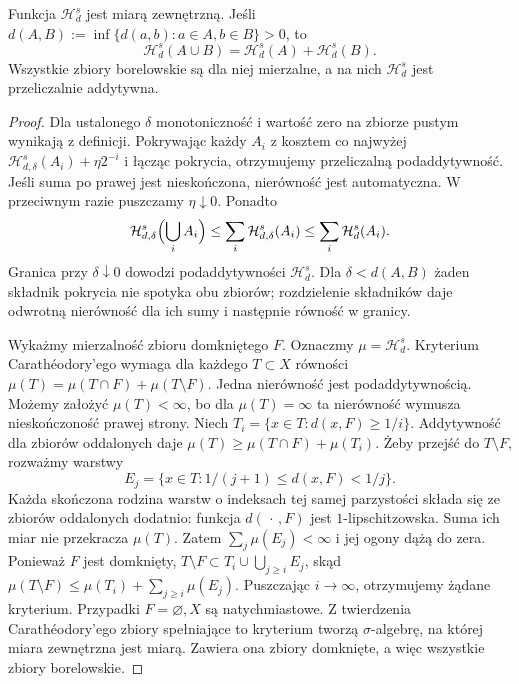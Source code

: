 \begin{stwierdzenie}
\label{prop:hausdorff-borel}
Funkcja $\mathcal H^s_d$ jest miarą zewnętrzną.
Jeśli $d(A,B):=\inf\{d(a,b):a\in A,b\in B\}>0$, to
\[
 \mathcal H^s_d(A\cup B)=\mathcal H^s_d(A)+\mathcal H^s_d(B).
\]
Wszystkie zbiory borelowskie są dla niej mierzalne,
a na nich $\mathcal H^s_d$ jest przeliczalnie addytywna.
\end{stwierdzenie}
\begin{proof}
Dla ustalonego $\delta$ monotoniczność i wartość zero
na zbiorze pustym wynikają z definicji. Pokrywając
każdy $A_i$ z kosztem co najwyżej
$\mathcal H^s_{d,\delta}(A_i)+\eta2^{-i}$ i łącząc
pokrycia, otrzymujemy przeliczalną podaddytywność.
Jeśli suma po prawej jest nieskończona, nierówność
jest automatyczna. W przeciwnym razie puszczamy
$\eta\downarrow0$. Ponadto
\[
 \mathcal H^s_{d,\delta}\Bigl(\bigcup_i A_i\Bigr)
 \leq\sum_i\mathcal H^s_{d,\delta}(A_i)
 \leq\sum_i\mathcal H^s_d(A_i).
\]
Granica przy $\delta\downarrow0$ dowodzi
podaddytywności $\mathcal H^s_d$. Dla
$\delta<d(A,B)$ żaden składnik pokrycia nie spotyka
obu zbiorów; rozdzielenie składników daje odwrotną
nierówność dla ich sumy i następnie równość w granicy.

Wykażmy mierzalność zbioru domkniętego $F$.
Oznaczmy $\mu=\mathcal H^s_d$. Kryterium Carathéodory'ego
wymaga dla każdego $T\subset X$ równości
$\mu(T)=\mu(T\cap F)+\mu(T\setminus F)$.
Jedna nierówność jest podaddytywnością. Możemy założyć
$\mu(T)<\infty$, bo dla $\mu(T)=\infty$ ta nierówność
wymusza nieskończoność prawej strony.
Niech $T_i=\{x\in T:d(x,F)\geq1/i\}$.
Addytywność dla zbiorów oddalonych daje
$\mu(T)\geq\mu(T\cap F)+\mu(T_i)$.
Żeby przejść do $T\setminus F$, rozważmy warstwy
\[
 E_j=\{x\in T:1/(j+1)\leq d(x,F)<1/j\}.
\]
Każda skończona rodzina warstw o indeksach tej samej
parzystości składa się ze zbiorów oddalonych dodatnio:
funkcja $d(\,\cdot\,,F)$ jest $1$-lipschitzowska.
Suma ich miar nie przekracza $\mu(T)$.
Zatem $\sum_j\mu(E_j)<\infty$ i jej ogony dążą do zera.
Ponieważ $F$ jest domknięty,
$T\setminus F\subset T_i\cup\bigcup_{j\geq i}E_j$,
skąd $\mu(T\setminus F)\leq\mu(T_i)+\sum_{j\geq i}\mu(E_j)$.
Puszczając $i\to\infty$, otrzymujemy żądane kryterium.
Przypadki $F=\varnothing,X$ są natychmiastowe.
Z twierdzenia Carathéodory'ego zbiory spełniające to
kryterium tworzą $\sigma$-algebrę, na której miara
zewnętrzna jest miarą. Zawiera ona zbiory domknięte,
a więc wszystkie zbiory borelowskie.
\end{proof}

